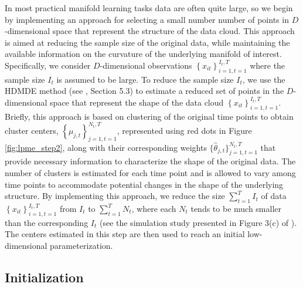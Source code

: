 \documentclass[11pt,reqno]{article}
\theoremstyle{definition}
\begin{document}
In most practical manifold learning tasks data are often quite large, so we begin by implementing an approach for selecting a small number number of points in $D$-dimensional space that represent the structure of the data cloud. This approach is aimed at reducing the sample size of the original data, while maintaining the available information on the curvature of the underlying manifold of interest. Specifically, we consider $D$-dimensional observations $\left\{x_{it}\right\}_{i=1, t=1}^{I_t, T}$ where the sample size $I_t$ is assumed to be large. To reduce the sample size $I_t$, we use the HDMDE method (see \cite{mengPrincipalManifoldEstimation2021}, Section 5.3) to estimate a reduced set of points in the $D$-dimensional space that represent the shape of the data cloud $\left\{x_{it}\right\}_{i=1, t=1}^{I_t, T}$. Briefly, this approach is based on clustering of the original time points to obtain cluster centers, $\left\{\mu_{j, t}\right\}_{j=1, t=1}^{N_t, T}$, represented using red dots in Figure \ref{fig:lpme_step2}, along with their corresponding weights $\{\hat{\theta}_{j, t}\}_{j=1, t=1}^{N_t, T}$ that provide necessary information to characterize the shape of the original data. The number of clusters is estimated for each time point and is allowed to vary among time points to accommodate potential changes in the shape of the underlying structure. By implementing this approach, we reduce the size $\sum_{t=1}^T I_t$ of data $\left\{x_{it}\right\}_{i=1, t=1}^{I_t, T}$ from $I_t$ to $\sum_{t=1}^T N_t$, where each $N_t$ tends to be much smaller than the corresponding $I_t$ (see the simulation study presented in Figure 3(c) of \cite{mengPrincipalManifoldEstimation2021}). The centers estimated in this step are then used to reach an initial low-dimensional parameterization.

\subsection*{Initialization}
\end{document}
